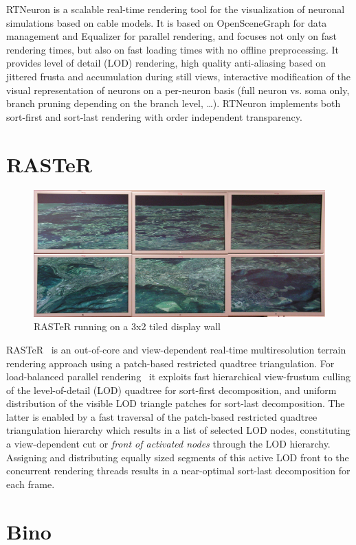 RTNeuron \cite{HBBES:13} is a scalable real-time rendering tool for the
visualization of neuronal simulations based on cable models. It is based on
OpenSceneGraph for data management and Equalizer for parallel rendering, and
focuses not only on fast rendering times, but also on fast loading times with no
offline preprocessing. It provides level of detail (LOD) rendering, high quality
anti-aliasing based on jittered frusta and accumulation during still views,
interactive modification of the visual representation of neurons on a per-neuron
basis (full neuron vs. soma only, branch pruning depending on the branch level,
\dots). RTNeuron implements both sort-first and sort-last rendering with order
independent transparency.

\section{RASTeR}

\begin{figure}
  \includegraphics[width=.618\textwidth]{images/raster}
  {\caption{\label{fRaster}RASTeR running on a 3x2 tiled display wall}}
\end{figure}

RASTeR~\cite{BGP:09} is an out-of-core and view-dependent real-time
multiresolution terrain rendering approach using a patch-based restricted
quadtree triangulation. For load-balanced parallel rendering~\cite{GMBP:10} it
exploits fast hierarchical view-frustum culling of the level-of-detail (LOD)
quadtree for sort-first decomposition, and uniform distribution of the visible
LOD triangle patches for sort-last decomposition. The latter is enabled by a
fast traversal of the patch-based restricted quadtree triangulation hierarchy
which results in a list of selected LOD nodes, constituting a view-dependent cut
or \emph{front of activated nodes} through the LOD hierarchy. Assigning and
distributing equally sized segments of this active LOD front to the concurrent
rendering threads results in a near-optimal sort-last decomposition for each
frame.

\section{Bino}

